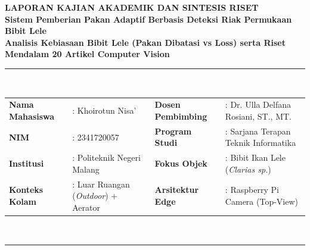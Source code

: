 \documentclass[10pt,a4paper]{article}
\begin{document}
\begin{center}
    {\Large \textbf{\color{blue!85!black}LAPORAN KAJIAN AKADEMIK DAN SINTESIS RISET}}\\[2pt]
    {\large \textbf{\color{blue!85!black}Sistem Pemberian Pakan Adaptif Berbasis Deteksi Riak Permukaan Bibit Lele}}\\[2pt]
    {\normalsize \textbf{Analisis Kebiasaan Bibit Lele (Pakan Dibatasi vs Loss) serta Riset Mendalam 20 Artikel Computer Vision}}\\[4pt]
    \rule{\textwidth}{0.8pt}\\[3pt]
    \noindent
    \begin{tabularx}{\textwidth}{@{}l p{5.5cm} l X@{}}
        \textbf{Nama Mahasiswa} & : Khoirotun Nisa' & \textbf{Dosen Pembimbing} & : Dr. Ulla Delfana Rosiani, ST., MT. \\
        \textbf{NIM} & : 2341720057 & \textbf{Program Studi} & : Sarjana Terapan Teknik Informatika \\
        \textbf{Institusi} & : Politeknik Negeri Malang & \textbf{Fokus Objek} & : Bibit Ikan Lele (\textit{Clarias sp.}) \\
        \textbf{Konteks Kolam} & : Luar Ruangan (\textit{Outdoor}) + Aerator & \textbf{Arsitektur Edge} & : Raspberry Pi Camera (Top-View) \\
    \end{tabularx}\\[2pt]
    \rule{\textwidth}{0.8pt}
\end{center}

\vspace{-0.3cm}
\end{document}
